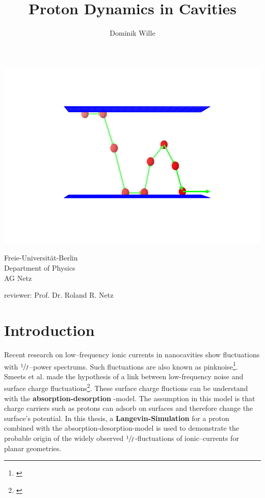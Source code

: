 \documentclass[a4paper, parskip=half]{scrartcl}
\title{Proton Dynamics in Cavities}
\author{Dominik Wille}
\newcommand{\effect}[1]{%
	\textbf{#1}%
}
\newcommand{\myCite}[1]{\footnote{\cite{#1} \citeauthor{#1} \citetitle{#1} \citeyear{#1}}}
\begin{document}
\maketitle

\includegraphics[width=\textwidth]{img/title}

\vfill

\enlargethispage{2cm}
  \parbox[t]{0.45\textwidth}{%
   Freie-Universität-Berlin\\
   Department of Physics\\
   AG Netz
  }
  \parbox[t]{0.55\textwidth}{\raggedleft%
     reviewer: Prof. Dr. Roland R. Netz
  }

\thispagestyle{empty}
\newpage
\tableofcontents
\thispagestyle{empty}
\newpage

\section{Introduction}%
Recent research on low--frequency ionic currents in nanocavities show fluctuations with $\sfrac{1}{f}$--power spectrums. Such fluctuations are also known as pinknoise\myCite{pinknoise}. Smeets et al. made the hypothesis of a link between low-frequency noise and surface charge fluctuations\myCite{paper0}. These surface charge fluctions can be understand with the \effect{absorption-desorption}-model. The assumption in this model is that charge carriers such as protons can adsorb on surfaces and therefore change the surface's potential. In this thesis, a \effect{Langevin-Simulation} for a proton combined with the absorption-desorption-model is used to demonstrate the probable origin of the widely observed $\sfrac{1}{f}$-fluctuations of ionic--currents for planar geometries.
\end{document}
